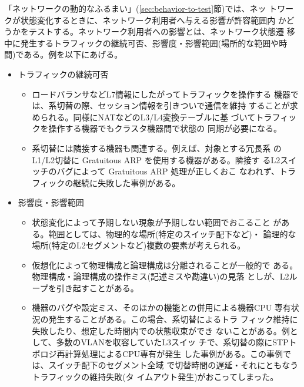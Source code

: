 「ネットワークの動的なふるまい」(\ref{sec:behavior-to-test}節)では、ネッ
トワークが状態変化するときに、ネットワーク利用者へ与える影響が許容範囲内
かどうかをテストする。ネットワーク利用者への影響とは、ネットワーク状態遷
移中に発生するトラフィックの継続可否、影響度・影響範囲(場所的な範囲や時
間)である。例を以下にあげる。
\begin{itemize}
 \item トラフィックの継続可否
       \begin{itemize}
        \item ロードバランサなどL7情報にしたがってトラフィックを操作する
              機器では、系切替の際、セッション情報を引きついで通信を維持
              することが求められる。同様にNATなどのL3/L4変換テーブルに基
              づいてトラフィックを操作する機器でもクラスタ機器間で状態の
              同期が必要になる。
        \item 系切替には隣接する機器も関連する。例えば、対象とする冗長系
              のL1/L2切替に Gratuitous ARP を使用する機器がある。隣接す
              るL2スイッチのバグによって Gratuitous ARP 処理が正しくおこ
              なわれず、トラフィックの継続に失敗した事例がある。
       \end{itemize}
 \item 影響度・影響範囲
       \begin{itemize}
        \item 状態変化によって予期しない現象が予期しない範囲でおこること
              がある。範囲としては、物理的な場所(特定のスイッチ配下など)・
              論理的な場所(特定のL2セグメントなど)複数の要素が考えられる。
        \item 仮想化によって物理構成と論理構成は分離されることが一般的で
              ある。物理構成・論理構成の操作ミス(記述ミスや勘違い)の見落
              としが、L2ループを引き起すことがある。
        \item 機器のバグや設定ミス、そのほかの機能との併用による機器CPU
              専有状況の発生することがある。この場合、系切替によるトラ
              フィック維持に失敗したり、想定した時間内での状態収束ができ
              ないことがある。例として、多数のVLANを収容していたL3スイッ
              チで、系切替の際にSTPトポロジ再計算処理によるCPU専有が発生
              した事例がある。この事例では、スイッチ配下のセグメント全域
              で切替時間の遅延・それにともなうトラフィックの維持失敗(タ
              イムアウト発生)がおこってしまった。
       \end{itemize}
\end{itemize}

